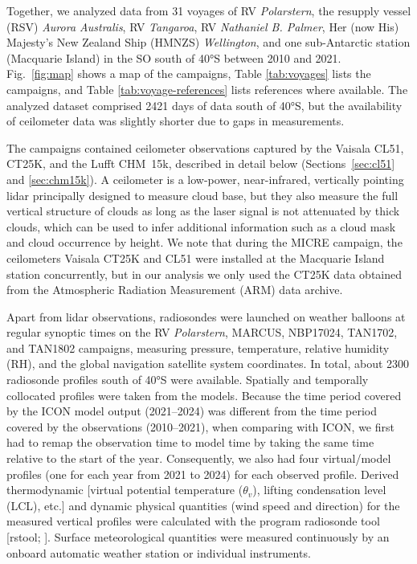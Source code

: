 \documentclass[draft]{agujournal2019}
\begin{document}
Together, we analyzed data from 31 voyages of RV \emph{Polarstern}, the resupply vessel (RSV) \emph{Aurora Australis}, RV \emph{Tangaroa}, RV \emph{Nathaniel B. Palmer}, Her (now His) Majesty's New Zealand Ship (HMNZS) \emph{Wellington}, and one sub-Antarctic station (Macquarie Island) in the SO south of 40°S between 2010 and 2021. Fig.~\ref{fig:map} shows a map of the campaigns, Table \ref{tab:voyages} lists the campaigns, and Table \ref{tab:voyage-references} lists references where available. The analyzed dataset comprised 2421 days of data south of 40°S, but the availability of ceilometer data was slightly shorter due to gaps in measurements.

The campaigns contained ceilometer observations captured by the Vaisala CL51, CT25K, and the Lufft CHM~15k, described in detail below (Sections~\ref{sec:cl51} and \ref{sec:chm15k}). A ceilometer is a low-power, near-infrared, vertically pointing lidar principally designed to measure cloud base, but they also measure the full vertical structure of clouds as long as the laser signal is not attenuated by thick clouds, which can be used to infer additional information such as a cloud mask and cloud occurrence by height. We note that during the MICRE campaign, the ceilometers Vaisala CT25K and CL51 were installed at the Macquarie Island station concurrently, but in our analysis we only used the CT25K data obtained from the Atmospheric Radiation Measurement (ARM) data archive.

Apart from lidar observations, radiosondes were launched on weather balloons at regular synoptic times on the RV \emph{Polarstern}, MARCUS, NBP17024, TAN1702, and TAN1802 campaigns, measuring pressure, temperature, relative humidity (RH), and the global navigation satellite system coordinates. In total, about 2300 radiosonde profiles south of 40°S were available. Spatially and temporally collocated profiles were taken from the models. Because the time period covered by the ICON model output (2021--2024) was different from the time period covered by the observations (2010--2021), when comparing with ICON, we first had to remap the observation time to model time by taking the same time relative to the start of the year. Consequently, we also had four virtual/model profiles (one for each year from 2021 to 2024) for each observed profile. Derived thermodynamic [virtual potential temperature ($\theta_v$), lifting condensation level (LCL), etc.] and dynamic physical quantities (wind speed and direction) for the measured vertical profiles were calculated with the program radiosonde tool [rstool; ]. Surface meteorological quantities were measured continuously by an onboard automatic weather station or individual instruments.
\end{document}
